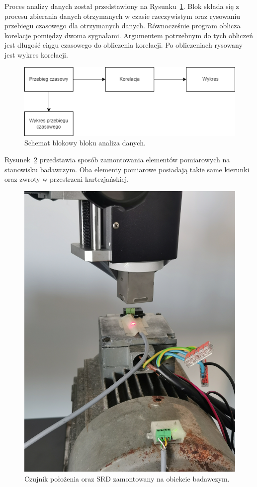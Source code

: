 \documentclass[a4paper, 12pt]{mwart}
\begin{document}
Proces analizy danych został przedstawiony na Rysunku~\ref{fig:analizadanych}. Blok składa się z procesu zbierania danych otrzymanych w czasie rzeczywistym oraz rysowaniu przebiegu czasowego dla otrzymanych danych. Równocześnie program oblicza korelacje pomiędzy dwoma sygnałami. Argumentem potrzebnym do tych obliczeń jest długość ciągu czasowego do obliczenia korelacji. Po obliczeniach rysowany jest wykres korelacji.
\begin{figure}[H]
	\centering
	\includegraphics[width=0.9\linewidth]{assets/analiza_danych.drawio}
	\caption{Schemat blokowy bloku analiza danych.}
	\label{fig:analizadanych}
\end{figure}

Rysunek~\ref{fig:img20221108124622} przedstawia sposób zamontowania elementów pomiarowych na stanowisku badawczym. Oba elementy pomiarowe posiadają takie same kierunki oraz zwroty w przestrzeni kartezjańskiej.
\begin{figure}[h!]
	\centering
	\includegraphics[width=0.6\linewidth]{assets/IMG_20221108_124622}
	\caption{Czujnik położenia oraz SRD zamontowany na obiekcie badawczym.}
	\label{fig:img20221108124622}
\end{figure}
 
\end{document}
